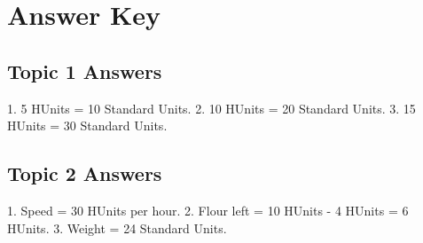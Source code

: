 \documentclass{article}
\begin{document}
\section*{Answer Key}
\subsection*{Topic 1 Answers}
1. 5 HUnits = 10 Standard Units.
2. 10 HUnits = 20 Standard Units.
3. 15 HUnits = 30 Standard Units.

\subsection*{Topic 2 Answers}
1. Speed = 30 HUnits per hour.
2. Flour left = 10 HUnits - 4 HUnits = 6 HUnits.
3. Weight = 24 Standard Units.
\end{document}
